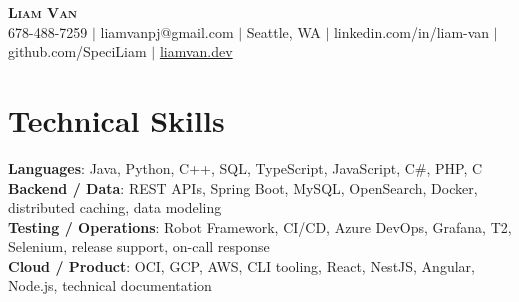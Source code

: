 \documentclass[letterpaper,11pt]{article}
\begin{document}

%
\begin{center}
    \textbf{\Huge \scshape Liam Van} \\ \vspace{1pt}
    \small 678-488-7259 $|$ \small {liamvanpj@gmail.com} $|$ Seattle, WA
 {{$|$ linkedin.com/in/liam-van} {$|$ github.com/SpeciLiam} {$|$ \href{https://liamvan.dev}{liamvan.dev}}}

\end{center}

\section{Technical Skills}
 \begin{itemize}[leftmargin=0.15in, label={}]
    \small{\item{
     \textbf{Languages}{: Java, Python, C++, SQL, TypeScript, JavaScript, C\#, PHP, C} \\
     \textbf{Backend / Data}{: REST APIs, Spring Boot, MySQL, OpenSearch, Docker, distributed caching, data modeling} \\
     \textbf{Testing / Operations}{: Robot Framework, CI/CD, Azure DevOps, Grafana, T2, Selenium, release support, on-call response} \\
     \textbf{Cloud / Product}{: OCI, GCP, AWS, CLI tooling, React, NestJS, Angular, Node.js, technical documentation} \\
    }}
 \end{itemize}
%

\end{document}
